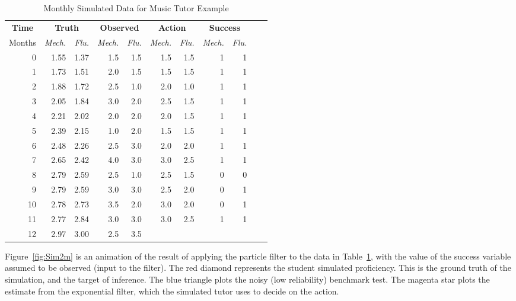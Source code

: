 \documentclass[12pt]{RR-article}
\begin{document}
\begin{table}
\caption{Monthly Simulated Data for Music Tutor Example}
\label{tab:sim2m}
\begin{tabular}{|r|rr|rr|rr|rr|rr|}
\hline
\multicolumn{1}{|c|}{\bf Time} & \multicolumn{2}{c|}{\bf Truth} &
\multicolumn{2}{c|}{\bf Observed} & \multicolumn{2}{c|}{\bf Action} &
\multicolumn{2}{c|}{\bf Success} \\
Months & {\it Mech.} & {\it Flu.} & {\it Mech.} & {\it Flu.} & 
{\it Mech.} & {\it Flu.} & {\it Mech.} & {\it Flu.} \\ \hline
 0 & 1.55 & 1.37 & 1.5 & 1.5 & 1.5 & 1.5 & 1 & 1 \\
 1 & 1.73 & 1.51 & 2.0 & 1.5 & 1.5 & 1.5 & 1 & 1 \\
 2 & 1.88 & 1.72 & 2.5 & 1.0 & 2.0 & 1.0 & 1 & 1 \\
 3 & 2.05 & 1.84 & 3.0 & 2.0 & 2.5 & 1.5 & 1 & 1 \\
 4 & 2.21 & 2.02 & 2.0 & 2.0 & 2.0 & 1.5 & 1 & 1 \\
 5 & 2.39 & 2.15 & 1.0 & 2.0 & 1.5 & 1.5 & 1 & 1 \\
 6 & 2.48 & 2.26 & 2.5 & 3.0 & 2.0 & 2.0 & 1 & 1 \\
 7 & 2.65 & 2.42 & 4.0 & 3.0 & 3.0 & 2.5 & 1 & 1 \\
 8 & 2.79 & 2.59 & 2.5 & 1.0 & 2.5 & 1.5 & 0 & 0 \\
 9 & 2.79 & 2.59 & 3.0 & 3.0 & 2.5 & 2.0 & 0 & 1 \\
 10 & 2.78 & 2.73 & 3.5 & 2.0 & 3.0 & 2.0 & 0 & 1 \\
 11 & 2.77 & 2.84 & 3.0 & 3.0 & 3.0 & 2.5 & 1 & 1 \\
 12 & 2.97 & 3.00 & 2.5 & 3.5 &  &  &  &  \\
\hline
\end{tabular}
\end{table}


Figure~\ref{fig:Sim2m} is an animation of the result of applying the particle filter to
the data in Table~\ref{tab:sim2m}, with the value of the success
variable assumed to be observed (input to the filter).  The red
diamond represents the student simulated proficiency.  This is the
ground truth of the simulation, and the target of inference.  The blue
triangle plots the noisy (low reliability) benchmark test.  The
magenta star plots the estimate from the exponential filter, which the
simulated tutor uses to decide on the action.
\end{document}
